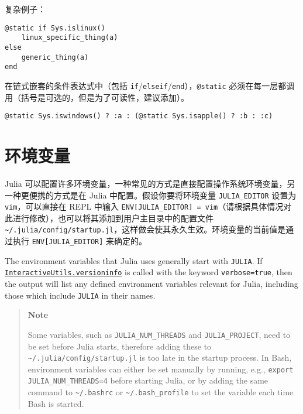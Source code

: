 复杂例子：




\begin{verbatim}
@static if Sys.islinux()
    linux_specific_thing(a)
else
    generic_thing(a)
end
\end{verbatim}



在链式嵌套的条件表达式中（包括 \texttt{if}/\texttt{elseif}/\texttt{end}），\texttt{@static} 必须在每一层都调用（括号是可选的，但是为了可读性，建议添加）。




\begin{verbatim}
@static Sys.iswindows() ? :a : (@static Sys.isapple() ? :b : :c)
\end{verbatim}



\hypertarget{4919662572867023119}{}


\chapter{环境变量}



Julia 可以配置许多环境变量，一种常见的方式是直接配置操作系统环境变量，另一种更便携的方式是在 Julia 中配置。假设你要将环境变量 \texttt{JULIA\_EDITOR} 设置为 \texttt{vim}，可以直接在 REPL 中输入 \texttt{ENV[{\textquotedbl}JULIA\_EDITOR{\textquotedbl}] = {\textquotedbl}vim{\textquotedbl}}（请根据具体情况对此进行修改），也可以将其添加到用户主目录中的配置文件 \texttt{{\textasciitilde}/.julia/config/startup.jl}，这样做会使其永久生效。环境变量的当前值是通过执行 \texttt{ENV[{\textquotedbl}JULIA\_EDITOR{\textquotedbl}]} 来确定的。



The environment variables that Julia uses generally start with \texttt{JULIA}. If \hyperlink{11698106121547091928}{\texttt{InteractiveUtils.versioninfo}} is called with the keyword \texttt{verbose=true}, then the output will list any defined environment variables relevant for Julia, including those which include \texttt{JULIA} in their names.



\begin{quote}
\textbf{Note}

Some variables, such as \texttt{JULIA\_NUM\_THREADS} and \texttt{JULIA\_PROJECT}, need to be set before Julia starts, therefore adding these to \texttt{{\textasciitilde}/.julia/config/startup.jl} is too late in the startup process. In Bash, environment variables can either be set manually by running, e.g., \texttt{export JULIA\_NUM\_THREADS=4} before starting Julia, or by adding the same command to \texttt{{\textasciitilde}/.bashrc} or \texttt{{\textasciitilde}/.bash\_profile} to set the variable each time Bash is started.

\end{quote}


